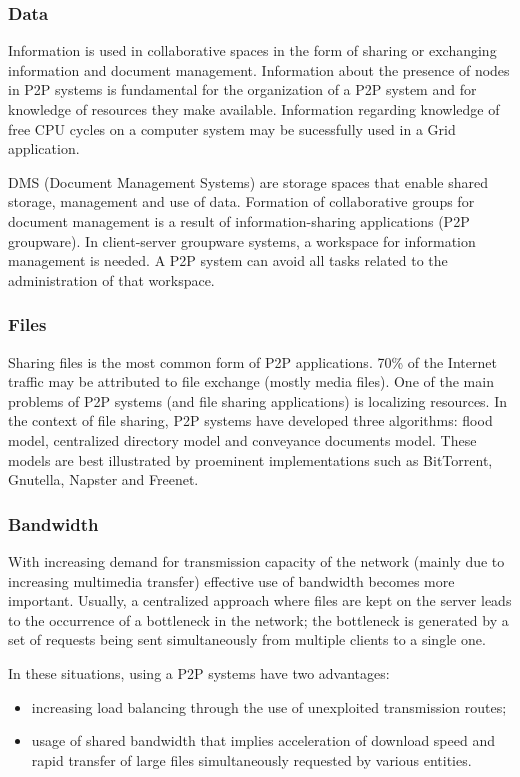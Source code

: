 \subsubsection{Data}

Information is used in collaborative spaces in the form of sharing or
exchanging information and document management. Information about the presence
of nodes in P2P systems is fundamental for the organization of a P2P system
and for knowledge of resources they make available. Information regarding
knowledge of free CPU cycles on a computer system may be sucessfully used in a
Grid application.

DMS (Document Management Systems) are storage spaces that enable shared
storage, management and use of data. Formation of collaborative groups for
document management is a result of information-sharing applications (P2P
groupware). In client-server groupware systems, a workspace for
information management is needed. A P2P system can avoid all tasks related to
the administration of that workspace.

\subsubsection{Files}

Sharing files is the most common form of P2P applications. 70\% of the
Internet traffic may be attributed to file exchange (mostly media files). One
of the main problems of P2P systems (and file sharing applications) is
localizing resources. In the context of file sharing, P2P systems have
developed three algorithms: flood model, centralized directory model and
conveyance documents model. These models are best illustrated by proeminent
implementations such as BitTorrent, Gnutella, Napster and Freenet.

\subsubsection{Bandwidth}

With increasing demand for transmission capacity of the network (mainly due to
increasing multimedia transfer) effective use of bandwidth becomes more
important. Usually, a centralized approach where files are kept on the
server leads to the occurrence of a bottleneck in the network; the
bottleneck is generated by a set of requests being sent simultaneously from
multiple clients to a single one.

In these situations, using a P2P systems have two advantages:
\begin{itemize}
  \item increasing load balancing through the use of unexploited transmission
  routes;
  \item usage of shared bandwidth that implies acceleration of download speed
  and rapid transfer of large files simultaneously requested by various
  entities.
\end{itemize}

